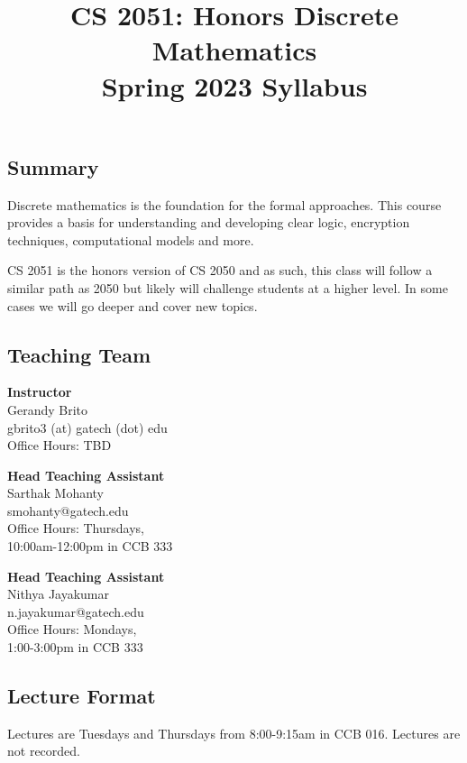 \documentclass{article}
\title{\vspace{-1cm}CS 2051: Honors Discrete Mathematics \\Spring 2023 Syllabus\vspace{-1cm}}
\author{}
\date{}
\begin{document}
\maketitle

\subsection*{Summary}
    Discrete mathematics is the foundation for the formal approaches. This course provides a basis for understanding and developing clear logic, encryption techniques, computational models and more.
    
    \vspace{3mm}
    CS 2051 is the honors version of CS 2050 and as such, this class will follow a similar path as 2050 but likely will challenge students at a higher level. In some cases we will go deeper and cover new topics.

\subsection*{Teaching Team}
    \begin{multicols}{3}
        \textbf{Instructor} \\
        \noindent Gerandy Brito \\
        gbrito3 (at) gatech (dot) edu \\
        Office Hours: TBD

        \columnbreak

        \textbf{Head Teaching Assistant} \\
        Sarthak Mohanty \\
        smohanty@gatech.edu \\
        Office Hours: Thursdays, \\
        10:00am-12:00pm in CCB 333

        \columnbreak
        
        \textbf{Head Teaching Assistant} \\
        Nithya Jayakumar \\
        n.jayakumar@gatech.edu \\
        Office Hours: Mondays, \\
        1:00-3:00pm in CCB 333
    \end{multicols}

\subsection*{Lecture Format}
    Lectures are Tuesdays and Thursdays from 8:00-9:15am in CCB 016. Lectures are not recorded.
    
\end{document}
